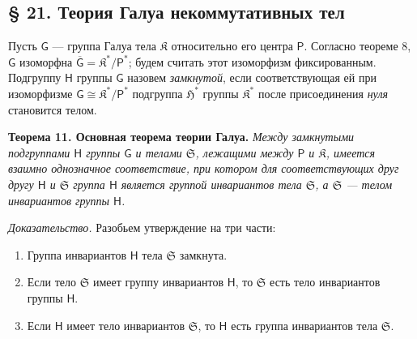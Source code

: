 \documentclass[11pt]{article}
\begin{document}
\subsection*{§ 21. Теория Галуа некоммутативных тел}\label{die-galoissche-theorie-der-nichtkommutativen-koerper}

Пусть \(\mathsf{G}\) --- группа Галуа тела \(\mathfrak K\) относительно его центра \(\mathsf P\). Согласно теореме 8, \(\mathsf{G}\) изоморфна \(\overline{\mathsf G}=\mathfrak K^*/\mathsf P^*\); будем считать этот изоморфизм фиксированным. Подгруппу \(\mathsf{H}\) группы \(\mathsf{G}\) назовем \emph{замкнутой}, если соответствующая ей при изоморфизме \(\mathsf{G}\cong\mathfrak K^*/\mathsf P^*\) подгруппа \(\mathfrak H^*\) группы \(\mathfrak K^*\) после присоединения \emph{нуля} становится телом.


\textbf{Теорема 11. Основная теорема теории Галуа.} \emph{Между замкнутыми подгруппами \(\mathsf{H}\) группы \(\mathsf{G}\) и телами \(\mathfrak S\), лежащими между \(\mathsf P\) и \(\mathfrak K\), имеется взаимно однозначное соответствие, при котором для соответствующих друг другу \(\mathsf{H}\) и \(\mathfrak S\) группа \(\mathsf{H}\) является группой инвариантов тела \(\mathfrak S\), а \(\mathfrak S\) --- телом инвариантов группы \(\mathsf{H}\).}

\emph{Доказательство.} Разобьем утверждение на три части:
\begin{enumerate}
\item Группа инвариантов \(\mathsf{H}\) тела \(\mathfrak S\) замкнута.
\item Если тело \(\mathfrak S\) имеет группу инвариантов \(\mathsf{H}\), то \(\mathfrak S\) есть тело инвариантов группы \(\mathsf{H}\).
\item Если \(\mathsf{H}\) имеет тело инвариантов \(\mathfrak S\), то \(\mathsf{H}\) есть группа инвариантов тела \(\mathfrak S\).
\end{enumerate}
\end{document}
